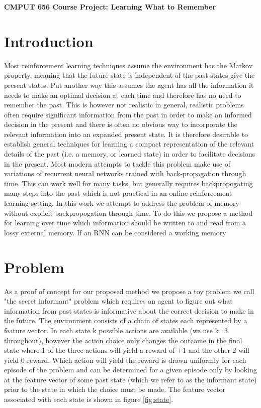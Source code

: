 \documentclass{article}
\begin{document}
\begin{center}
{\Large \textbf{CMPUT 656 Course Project: Learning What to Remember}}
\end{center}
\section*{Introduction}
Most reinforcement learning techniques assume the environment has the Markov property, meaning that the future state is independent of the past states give the present states. Put another way this assumes the agent has all the information it needs to make an optimal decision at each time and therefore has no need to remember the past. This is however not realistic in general, realistic problems often require significant information from the past in order to make an informed decision in the present and there is often no obvious way to incorporate the relevant information into an expanded present state. It is therefore desirable to establish general techniques for learning a compact representation of the relevant details of the past (i.e. a memory, or learned state) in order to facilitate decisions in the present.
Most modern attempts to tackle this problem make use of variations of recurrent neural networks trained with back-propagation through time. This can work well for many tasks, but generally requires backpropogating many steps into the past which is not practical in an online reinforcement learning setting. In this work we attempt to address the problem of memory without explicit backpropogation through time. To do this we propose a method for learning over time which information should be written to and read from a lossy external memory. If an RNN can be considered a working memory

\section*{Problem}
As a proof of concept for our proposed method we propose a toy problem we call "the secret informant" problem which requires an agent to figure out what information from past states is informative about the correct decision to make in the future. The environment consists of a chain of states each represented by a feature vector. In each state k possible actions are available (we use k=3 throughout), however the action choice only changes the outcome in the final state where 1 of the three actions will yield a reward of $+1$ and the other 2 will yield $0$ reward. Which action will yield the reward is drawn uniformly for each episode of the problem and can be determined for a given episode only by looking at the feature vector of some past state (which we refer to as the informant state) prior to the state in which the choice must be made. The feature vector associated with each state is shown in figure \ref{fig:state}.
\end{document}
